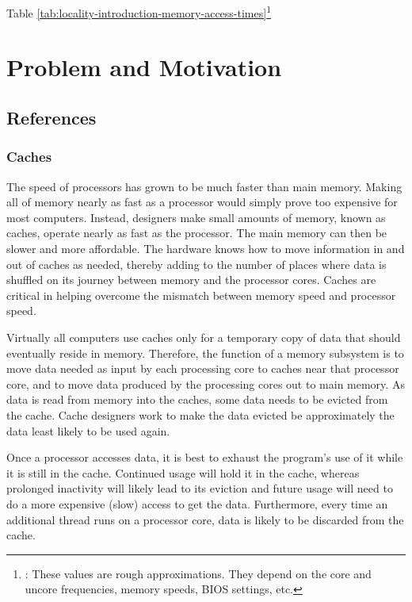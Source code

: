Table
\ref{tab:locality-introduction-memory-access-times}\footnote{\cite{Levinthal2009}:
  These values are rough approximations. They depend on the core and
  uncore frequencies, memory speeds, BIOS settings, etc.}

\section{Problem and Motivation}
\label{sec:locality-intro-problem-and-motivation}


\subsection{References}

\subsubsection{Caches}

The speed of processors has grown to be much faster than main
memory. Making all of memory nearly as fast as a processor would
simply prove too expensive for most computers. Instead, designers make
small amounts of memory, known as caches, operate nearly as fast as
the processor. The main memory can then be slower and more
affordable. The hardware knows how to move information in and out of
caches as needed, thereby adding to the number of places where data is
shuffled on its journey between memory and the processor cores. Caches
are critical in helping overcome the mismatch between memory speed and
processor speed.

Virtually all computers use caches only for a temporary copy of data
that should eventually reside in memory. Therefore, the function of a
memory subsystem is to move data needed as input by each processing
core to caches near that processor core, and to move data produced by
the processing cores out to main memory. As data is read from memory
into the caches, some data needs to be evicted from the cache. Cache
designers work to make the data evicted be approximately the data
least likely to be used again.

Once a processor accesses data, it is best to exhaust the program’s
use of it while it is still in the cache. Continued usage will hold it
in the cache, whereas prolonged inactivity will likely lead to its
eviction and future usage will need to do a more expensive (slow)
access to get the data. Furthermore, every time an additional thread
runs on a processor core, data is likely to be discarded from the
cache.

